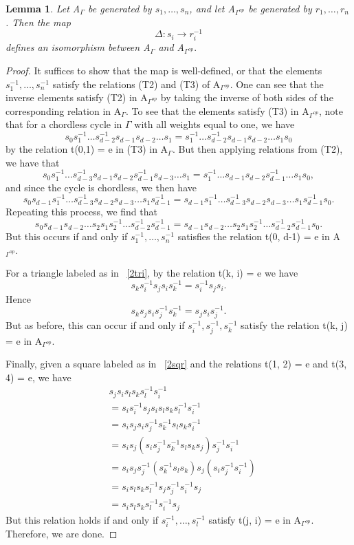 \documentclass[11pt]{amsart}
\newtheorem{lem}[thm]{Lemma}
\theoremstyle{definition}
\begin{document}
\begin{lem}\label{lem:op_homomorphism}
Let A$_{\Gamma}$ be generated by $s_{1}, \dots, s_{n}$, and let A$_{\Gamma^{op}}$ be generated by $r_{1}, \dots, r_{n}$. Then the map $$\Delta: s_{i} \rightarrow r_{i}^{-1}$$ defines an isomorphism between A$_{\Gamma}$ and A$_{\Gamma^{op}}.$
\end{lem}
\begin{proof}
It suffices to show that the map is well-defined, or that the elements $s_{1}^{-1}, \dots, s_{n}^{-1}$ satisfy the relations (T2) and (T3) of A$_{\Gamma^{op}}$. One can see that the inverse elements satisfy (T2) in A$_{\Gamma^{op}}$ by taking the inverse of both sides of the corresponding relation in A$_{\Gamma}$. To see that the elements satisfy (T3) in A$_{\Gamma^{op}}$, note that for a chordless cycle in $\Gamma$ with all weights equal to one, we have $$s_{0}s_{1}^{-1}\dots s_{d-2}^{-1}s_{d-1}s_{d-2}\dots s_{1} = s_{1}^{-1}\dots s_{d-2}^{-1}s_{d-1}s_{d-2}\dots s_{1}s_{0}$$ by the relation t(0,1) = e in (T3) in A$_{\Gamma}$. But then applying relations from (T2), we have that $$s_{0}s_{1}^{-1}\dots s_{d-3}^{-1}s_{d-1}s_{d-2}s_{d-1}^{-1}s_{d-3}\dots s_{1} = s_{1}^{-1}\dots s_{d-1}s_{d-2}s_{d-1}^{-1}\dots s_{1}s_{0},$$ and since the cycle is chordless, we then have $$s_{0}s_{d-1}s_{1}^{-1}\dots s_{d-3}^{-1}s_{d-2}s_{d-3}\dots s_{1}s_{d-1}^{-1} = s_{d-1}s_{1}^{-1}\dots s_{d-3}^{-1}s_{d-2}s_{d-3}\dots s_{1}s_{d-1}^{-1}s_{0}.$$ Repeating this process, we find that $$s_{0}s_{d-1}s_{d-2}\dots s_{2}s_{1}s_{2}^{-1}\dots s_{d-2}^{-1}s_{d-1}^{-1} = s_{d-1}s_{d-2}\dots s_{2}s_{1}s_{2}^{-1}\dots s_{d-2}^{-1}s_{d-1}^{-1}s_{0}.$$ But this occurs if and only if $s_{1}^{-1}, \dots, s_{n}^{-1}$ satisfies the relation t(0, d-1) = e in A$_{\Gamma^{op}}.$

For a triangle labeled as in ~\ref{2tri}, by the relation t(k, i) = e we have $$s_{k}s_{i}^{-1}s_{j}s_{i}s_{k}^{-1} = s_{i}^{-1}s_{j}s_{i}.$$ Hence $$s_{k}s_{j}s_{i}s_{j}^{-1}s_{k}^{-1} = s_{j}s_{i}s_{j}^{-1}.$$ But as before, this can occur if and only if $s_{i}^{-1}, s_{j}^{-1}, s_{k}^{-1}$ satisfy the relation t(k, j) = e in A$_{\Gamma^{op}}$.

Finally, given a square labeled as in ~\ref{2sqr} and the relations t(1, 2) = e and t(3, 4) = e, we have
\begin{align*}
& s_{j}s_{i}s_{l}s_{k}s_{l}^{-1}s_{i}^{-1} \\
&= s_{i}s_{i}^{-1}s_{j}s_{i}s_{l}s_{k}s_{l}^{-1}s_{i}^{-1} \\
&= s_{i}s_{j}s_{i}s_{j}^{-1}s_{k}^{-1}s_{l}s_{k}s_{i}^{-1} \\
&= s_{i}s_{j}(s_{i}s_{j}^{-1}s_{k}^{-1}s_{l}s_{k}s_{j})s_{j}^{-1}s_{i}^{-1} \\
&= s_{i}s_{j}s_{j}^{-1}(s_{k}^{-1}s_{l}s_{k})s_{j}(s_{i}s_{j}^{-1}s_{i}^{-1}) \\
&= s_{i}s_{l}s_{k}s_{l}^{-1}s_{j}s_{j}^{-1}s_{i}^{-1}s_{j} \\
&= s_{i}s_{l}s_{k}s_{l}^{-1}s_{i}^{-1}s_{j}
\end{align*}
But this relation holds if and only if $s_{i}^{-1}, \dots, s_{l}^{-1}$ satisfy t(j, i) = e in A$_{\Gamma^{op}}$. Therefore, we are done.
\end{proof}
\end{document}
